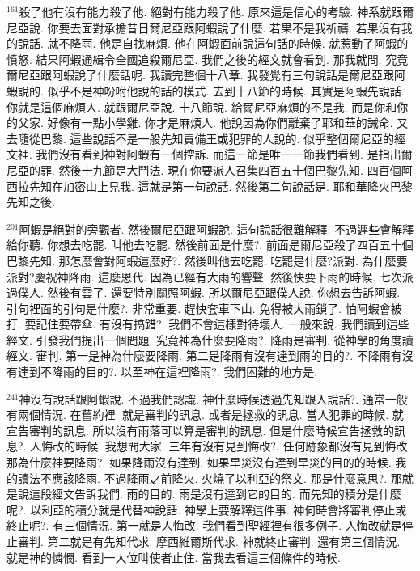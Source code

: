 \documentclass{book}
\begin{document}
$^{161}$殺了他有沒有能力殺了他.
絕對有能力殺了他.
原來這是信心的考驗.
神系就跟爾尼亞說.
你要去面對承擔昔日爾尼亞跟阿蝦說了什麼.
若果不是我祈禱.
若果沒有我的說話.
就不降雨.
他是自找麻煩.
他在阿蝦面前說這句話的時候.
就惹動了阿蝦的憤怒.
結果阿蝦通緝令全國追殺爾尼亞.
我們之後的經文就會看到.
那我就問.
究竟爾尼亞跟阿蝦說了什麼話呢.
我讀完整個十八章.
我發覺有三句說話是爾尼亞跟阿蝦說的.
似乎不是神吩咐他說的話的模式.
去到十八節的時候.
其實是阿蝦先說話.
你就是這個麻煩人.
就跟爾尼亞說.
十八節說.
給爾尼亞麻煩的不是我.
而是你和你的父家.
好像有一點小學雞.
你才是麻煩人.
他說因為你們離棄了耶和華的誡命.
又去隨從巴黎.
這些說話不是一般先知責備王或犯罪的人說的.
似乎整個爾尼亞的經文裡.
我們沒有看到神對阿蝦有一個控訴.
而這一節是唯一一節我們看到.
是指出爾尼亞的罪.
然後十九節是大鬥法.
現在你要派人召集四百五十個巴黎先知.
四百個阿西拉先知在加密山上見我.
這就是第一句說話.
然後第二句說話是.
耶和華降火巴黎先知之後.

$^{201}$阿蝦是絕對的旁觀者.
然後爾尼亞跟阿蝦說.
這句說話很難解釋.
不過遲些會解釋給你聽.
你想去吃罷.
叫他去吃罷.
然後前面是什麼?.
前面是爾尼亞殺了四百五十個巴黎先知.
那怎麼會對阿蝦這麼好?.
然後叫他去吃罷.
吃罷是什麼?派對.
為什麼要派對?慶祝神降雨.
這麼恩代.
因為已經有大雨的響聲.
然後快要下雨的時候.
七次派過僕人.
然後有雲了.
還要特別關照阿蝦.
所以爾尼亞跟僕人說.
你想去告訴阿蝦.
引句裡面的引句是什麼?.
非常重要.
趕快套車下山.
免得被大雨鎖了.
怕阿蝦會被打.
要記住要帶傘.
有沒有搞錯?.
我們不會這樣對待壞人.
一般來說.
我們讀到這些經文.
引發我們提出一個問題.
究竟神為什麼要降雨?.
降雨是審判.
從神學的角度讀經文.
審判.
第一是神為什麼要降雨.
第二是降雨有沒有達到雨的目的?.
不降雨有沒有達到不降雨的目的?.
以至神在這裡降雨?.
我們困難的地方是.

$^{241}$神沒有說話跟阿蝦說.
不過我們認識.
神什麼時候透過先知跟人說話?.
通常一般有兩個情況.
在舊約裡.
就是審判的訊息.
或者是拯救的訊息.
當人犯罪的時候.
就宣告審判的訊息.
所以沒有雨落可以算是審判的訊息.
但是什麼時候宣告拯救的訊息?.
人悔改的時候.
我想問大家.
三年有沒有見到悔改?.
任何跡象都沒有見到悔改.
那為什麼神要降雨?.
如果降雨沒有達到.
如果旱災沒有達到旱災的目的的時候.
我的讀法不應該降雨.
不過降雨之前降火.
火燒了以利亞的祭文.
那是什麼意思?.
那就是說這段經文告訴我們.
雨的目的.
雨是沒有達到它的目的.
而先知的積分是什麼呢?.
以利亞的積分就是代替神說話.
神學上要解釋這件事.
神何時會將審判停止或終止呢?.
有三個情況.
第一就是人悔改.
我們看到聖經裡有很多例子.
人悔改就是停止審判.
第二就是有先知代求.
摩西維爾斯代求.
神就終止審判.
還有第三個情況.
就是神的憐憫.
看到一大位叫使者止住.
當我去看這三個條件的時候.
\end{document}
